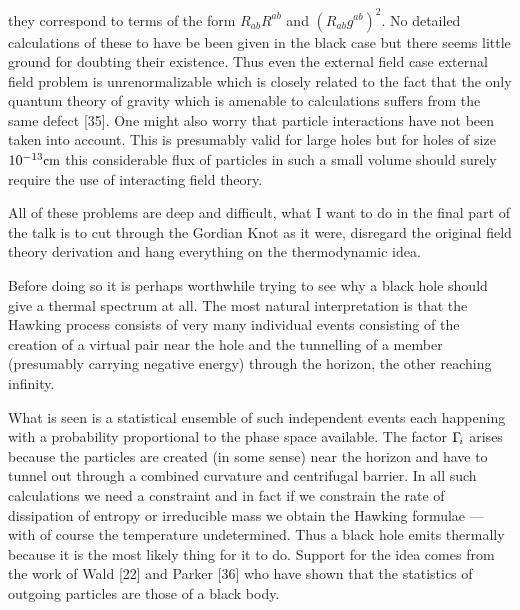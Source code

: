 they correspond to terms of the form $R_{ab}R^{ab}$ and $(R_{ab}g^{ab})^2$.
No detailed calculations of these to have be been given in the black case but there
seems little ground for doubting their existence. Thus even the external field case
external field problem is unrenormalizable which is closely related to the fact
that the only quantum theory of gravity which is amenable to calculations suffers
from the same defect [35]. One might also worry that particle interactions have not been
taken into account. This is presumably valid for large holes but for holes of size
$10^{-13}\text{\small cm}$ this considerable flux of particles in such a small volume should surely
require the use of interacting field theory.

All of these problems are deep and difficult, what I want to do in the
final part of the talk is to cut through the Gordian Knot as it were, disregard
the original field theory derivation and hang everything on the thermodynamic
idea.

Before doing so it is perhaps worthwhile trying to see why a black hole should give a thermal
spectrum at all. The most natural interpretation is that the Hawking process consists of very
many individual events consisting of the creation of a virtual pair near the hole and the
tunnelling of a member (presumably carrying negative energy) through the horizon, the other reaching infinity.

What is seen is a statistical ensemble of such independent events each happening
with a probability proportional to the phase space available. The factor $\GG_i$ arises
because the particles are created (in some sense) near the horizon and have to tunnel
out through a combined curvature and centrifugal barrier. In all such calculations we
need a constraint and in fact if we constrain the rate of dissipation of entropy or irreducible
mass we obtain the Hawking formulae --- with of course the temperature undetermined.
Thus a black hole emits thermally because it is the most likely thing for it to do. 
Support for the idea comes from the work of Wald [22] and Parker [36]
who have shown that the statistics of outgoing particles are those of a black body.

